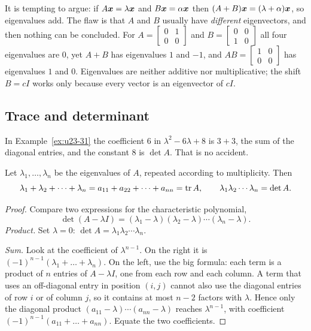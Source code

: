 \begin{trap}
It is tempting to argue: if $A\boldsymbol{x}=\lambda\boldsymbol{x}$ and $B\boldsymbol{x}=\alpha\boldsymbol{x}$ then
$(A+B)\boldsymbol{x}=(\lambda+\alpha)\boldsymbol{x}$, so eigenvalues add. The flaw is that $A$ and $B$
usually have \emph{different} eigenvectors, and then nothing can be concluded. For
$A=\left[\begin{smallmatrix} 0&1\\ 0&0\end{smallmatrix}\right]$ and
$B=\left[\begin{smallmatrix} 0&0\\ 1&0\end{smallmatrix}\right]$ all four eigenvalues are $0$,
yet $A+B$ has eigenvalues $1$ and $-1$, and $AB=\left[\begin{smallmatrix} 1&0\\ 0&0\end{smallmatrix}\right]$
has eigenvalues $1$ and $0$. Eigenvalues are neither additive nor multiplicative; the shift
$B=cI$ works only because every vector is an eigenvector of $cI$.
\end{trap}

\subsection{Trace and determinant}

In Example~\ref{ex:u23-31} the coefficient $6$ in $\lambda^{2}-6\lambda+8$ is $3+3$, the sum
of the diagonal entries, and the constant $8$ is $\det A$. That is no accident.

\begin{theorem}\label{thm:u23-trace}
Let $\lambda_1,\dots,\lambda_n$ be the eigenvalues of $A$, repeated according to
multiplicity. Then
\[
  \lambda_1+\lambda_2+\dots+\lambda_n=a_{11}+a_{22}+\dots+a_{nn}=\operatorname{tr} A,
  \qquad
  \lambda_1\lambda_2\cdots\lambda_n=\det A .
\]
\end{theorem}

\begin{proof}
Compare two expressions for the characteristic polynomial,
\[
  \det(A-\lambda I)=(\lambda_1-\lambda)(\lambda_2-\lambda)\cdots(\lambda_n-\lambda).
\]
\emph{Product.} Set $\lambda=0$: $\det A=\lambda_1\lambda_2\cdots\lambda_n$.

\emph{Sum.} Look at the coefficient of $\lambda^{n-1}$. On the right it is
$(-1)^{n-1}(\lambda_1+\dots+\lambda_n)$. On the left, use the big formula: each term is a
product of $n$ entries of $A-\lambda I$, one from each row and each column. A term that uses
an off-diagonal entry in position $(i,j)$ cannot also use the diagonal entries of row $i$ or
of column $j$, so it contains at most $n-2$ factors with $\lambda$. Hence only the diagonal
product $(a_{11}-\lambda)\cdots(a_{nn}-\lambda)$ reaches $\lambda^{n-1}$, with coefficient
$(-1)^{n-1}(a_{11}+\dots+a_{nn})$. Equate the two coefficients.
\end{proof}

